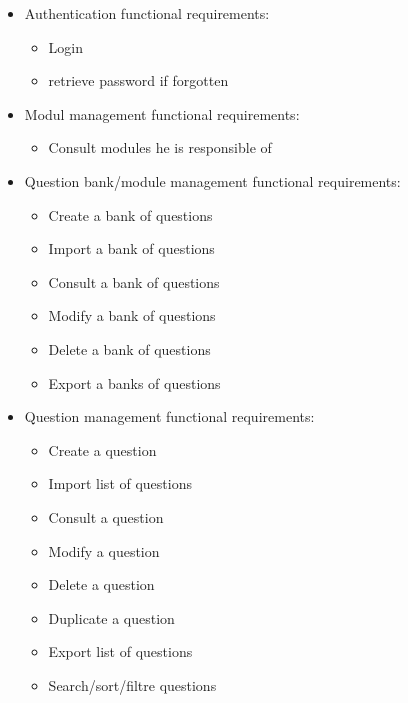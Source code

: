 \documentclass[a4paper,12p]{article}
\begin{document}
    \begin{itemize}

        \item{Authentication functional requirements:}
        \begin{itemize}
            \item Login
            \item retrieve password if forgotten
        \end{itemize}

        \item{Modul management functional requirements:}
        \begin{itemize}
            \item Consult modules he is responsible of
        \end{itemize}

        \item{Question bank/module management functional requirements:}
        \begin{itemize}
            \item Create a bank of questions
            \item Import a bank of questions
            \item Consult a bank of questions
            \item Modify a bank of questions
            \item Delete a bank of questions
            \item Export a banks of questions
        \end{itemize}

        \item{Question management functional requirements:}
        \begin{itemize}
            \item Create a question
            \item Import list of questions
            \item Consult a question
            \item Modify a question
            \item Delete a question
            \item Duplicate a question
            \item Export list of questions
            \item Search/sort/filtre questions
        \end{itemize}


\end{itemize}
\end{document}
